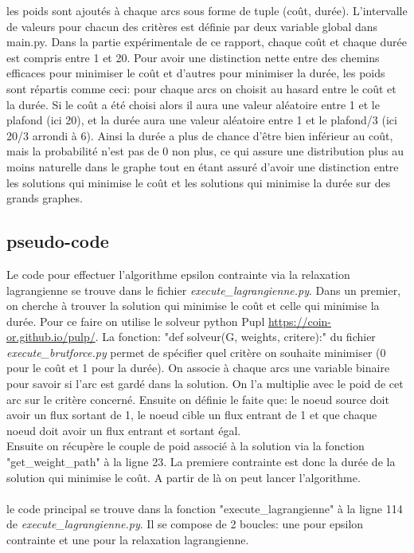 \documentclass[]{article}
\begin{document}
        les poids sont ajoutés à chaque arcs sous forme de tuple (coût, durée). 
        L'intervalle de valeurs pour chacun des critères est définie par deux variable
        global dans main.py. Dans la partie expérimentale de ce rapport, chaque coût
        et chaque durée est compris entre 1 et 20. Pour avoir une distinction nette entre
        des chemins efficaces pour minimiser le coût et d'autres pour minimiser la durée,
        les poids sont répartis comme ceci: pour chaque arcs on choisit au hasard
        entre le coût et la durée. Si le coût a été choisi alors il aura une valeur
        aléatoire entre 1 et le plafond (ici 20), et la durée aura une valeur aléatoire
        entre 1 et le plafond/3 (ici 20/3 arrondi à 6). Ainsi la durée a plus de chance 
        d'être bien inférieur au coût, mais la probabilité n'est pas de 0 non plus, ce qui
        assure une distribution plus au moins naturelle dans le graphe tout en étant assuré
        d'avoir une distinction entre les solutions qui minimise le coût et les solutions qui
        minimise la durée sur des grands graphes.

        \subsection{pseudo-code}
        
        Le code pour effectuer l'algorithme epsilon contrainte via la relaxation
        lagrangienne se trouve dans le fichier \textit{execute\_lagrangienne.py}.
        Dans un premier, on cherche à trouver la solution qui minimise le coût et
        celle qui minimise la durée. Pour ce faire on utilise le solveur python
        Pupl \url{https://coin-or.github.io/pulp/}. La fonction: "def solveur(G, weights, critere):"
        du fichier \textit{execute\_brutforce.py} permet de spécifier quel critère on 
        souhaite minimiser (0 pour le coût et 1 pour la durée). On associe à chaque arcs
        une variable binaire pour savoir si l'arc est gardé dans la solution. On l'a
        multiplie avec le poid de cet arc sur le critère concerné. Ensuite on définie le 
        faite que: le noeud source doit avoir un flux sortant de 1, le noeud cible un flux
        entrant de 1 et que chaque noeud doit avoir un flux entrant et sortant égal.\\
        Ensuite on récupère le couple de poid associé à la solution via la fonction
        "get\_weight\_path" à la ligne 23. La premiere contrainte est donc la durée de
        la solution qui minimise le coût. A partir de là on peut lancer l'algorithme.\\
        \\
        le code principal se trouve dans la fonction "execute\_lagrangienne" à la ligne
        114 de \textit{execute\_lagrangienne.py}. Il se compose de 2 boucles: une pour 
        epsilon contrainte et une pour la relaxation lagrangienne.\\
        
\end{document}
